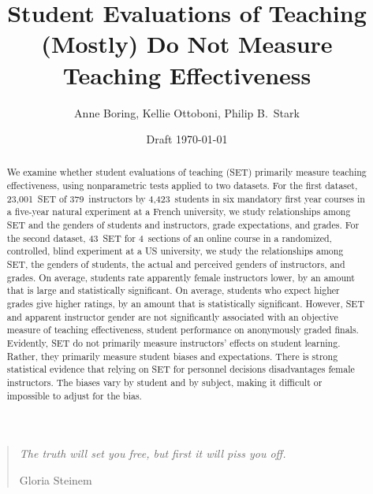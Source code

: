 \documentclass[12pt]{article}
\title{Student Evaluations of Teaching (Mostly) Do Not Measure Teaching Effectiveness}
\author{Anne Boring, Kellie Ottoboni, Philip B.~Stark}
\date{Draft \today}
\begin{document}
\maketitle

\newpage
\begin{quotation}
    \emph{The truth will set you free, but first it will piss you off.}
    
     \hfill Gloria Steinem

\begin{abstract}

We examine whether student evaluations of teaching (SET) 
primarily measure teaching effectiveness, using nonparametric tests applied
to two datasets. 
For the first dataset, 23,001~SET of 379~instructors by 4,423~students in six 
mandatory first year courses in a five-year natural experiment at a French university, 
we study relationships among SET and the genders of students and instructors, 
grade expectations, and grades.
For the second dataset, 43~SET for 4~sections of an online course in a randomized, controlled, 
blind experiment at a US university, 
we study the relationships among SET, the genders of students, 
the actual and perceived genders of instructors, and grades.
On average, students rate apparently female instructors lower, by an amount that is large and
statistically significant.
On average, students who expect higher grades give higher ratings, 
by an amount that is statistically significant.
However, SET and apparent instructor gender are not significantly associated 
with an objective measure of teaching effectiveness,
student performance on anonymously graded finals. 
Evidently, SET do not primarily measure instructors' effects on student learning. 
Rather, they primarily measure student biases and expectations.
There is strong statistical evidence that relying on SET for 
personnel decisions disadvantages female instructors.
The biases vary by student and by subject, making it 
difficult or impossible to adjust for the bias. 



\end{abstract}
\end{quotation}
\end{document}
